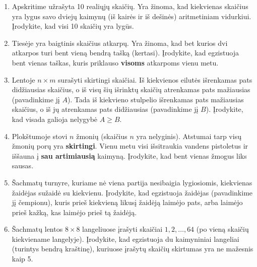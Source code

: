 \documentclass[11pt,a4paper]{scrartcl}
\begin{document}
\begin{enumerate}
    \renewcommand{\labelenumi}{\textbf{\theenumi.}}
    
    \item Apskritime užrašyta 10 realiųjų skaičių. Yra žinoma, kad kiekvienas skaičius yra lygus savo dviejų kaimynų (iš kairės ir iš dešinės) aritmetiniam vidurkiui. Įrodykite, kad visi 10 skaičių yra lygūs.
    \item Tiesėje yra baigtinis skaičius atkarpų. Yra žinoma, kad bet kurios dvi atkarpos turi bent vieną bendrą tašką (kertasi). Įrodykite, kad egzistuoja bent vienas taškas, kuris priklauso \textbf{visoms} atkarpoms vienu metu.
    \item Lentoje $n \times m$ surašyti skirtingi skaičiai. Iš kiekvienos eilutės išrenkamas pats didžiausias skaičius, o iš visų šių išrinktų skaičių atrenkamas pats mažiausias (pavadinkime jį $A$). Tada iš kiekvieno stulpelio išrenkamas pats mažiausias skaičius, o iš jų atrenkamas pats didžiausias (pavadinkime jį $B$). Įrodykite, kad visada galioja nelygybė $A \ge B$.
    \item Plokštumoje stovi $n$ žmonių (skaičius $n$ yra nelyginis). Atstumai tarp visų žmonių porų yra \textbf{skirtingi}. Vienu metu visi išsitraukia vandens pistoletus ir iššauna į \textbf{sau artimiausią} kaimyną. Įrodykite, kad bent vienas žmogus liks sausas.
    \item Šachmatų turnyre, kuriame nė viena partija nesibaigia lygiosiomis, kiekvienas žaidėjas sužaidė su kiekvienu. Įrodykite, kad egzistuoja žaidėjas (pavadinkime jį čempionu), kuris prieš kiekvieną likusį žaidėją laimėjo pats, arba laimėjo prieš kažką, kas laimėjo prieš tą žaidėją.
    \item Šachmatų lentos $8 \times 8$ langeliuose įrašyti skaičiai $1, 2, \dots, 64$ (po vieną skaičių kiekviename langelyje). Įrodykite, kad egzistuoja du kaimyniniai langeliai (turintys bendrą kraštinę), kuriuose įrašytų skaičių skirtumas yra ne mažesnis kaip 5.
    

\end{enumerate}
\end{document}
